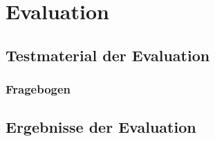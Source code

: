 \documentclass[Bachelorarbeit.tex]{subfiles}
\begin{document}
\chapter{Evaluation}
\label{anhangEvaluation}

\section{Testmaterial der Evaluation}
\label{anhangTestmaterial}

\newpage
\subsection{Fragebogen}
\label{anhangFragebogen}



\section{Ergebnisse der Evaluation}
\label{anhangErgebnisse}
\end{document}

